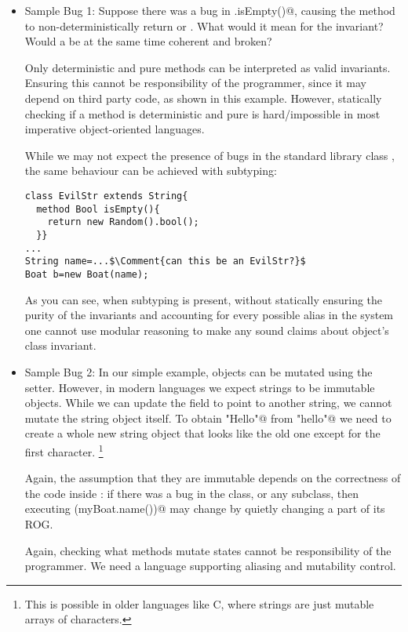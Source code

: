 \begin{itemize}
\item Sample Bug 1:
Suppose there was a bug in \Q@String.isEmpty()@, causing the method to non-deterministically return \Q@true@ or \Q@false@.
What would it mean for the \Q@Boat@ invariant?
Would a \Q@Boat@ be at the same time 
coherent and broken?

Only deterministic and pure methods can be interpreted as valid invariants.
Ensuring this cannot be responsibility of the \Q@Boat@ programmer, since it may depend on third party code, as shown in this example.
However, statically checking if a method is deterministic and pure is hard/impossible in most imperative object-oriented languages.

While we may not expect the presence of bugs in the standard library class \Q@String@, the same behaviour can be achieved with subtyping:
\saveSpace
\begin{lstlisting}
class EvilStr extends String{
  method Bool isEmpty(){
    return new Random().bool();
  }}
...
String name=...$\Comment{can this be an EvilStr?}$
Boat b=new Boat(name);
\end{lstlisting}
\saveSpace
As you can see, when subtyping is present,
without statically ensuring the purity of the invariants and accounting
for every possible alias in the system one cannot use modular 
reasoning to make any sound claims about object's class invariant.


\item Sample Bug 2:
In our simple example, \Q@Boat@ objects can be mutated using the setter.
However, in modern languages we expect strings to be immutable objects. While we can update the field \Q@name@ to point to another string, we cannot mutate the string object itself.
To obtain  \Q@"Hello"@ from \Q@"hello"@ we need to create a whole new string object that looks like the old one except for the first character.%
\footnote{This is possible in older languages like C, where strings are just mutable arrays of characters.}

Again, the assumption that they are immutable depends on the correctness of the code inside \Q@String@: if there was a bug in the \Q@String@ class, or any \Q@String@ subclass, then executing 
\Q@println(myBoat.name())@ may change \Q@myBoat@ by quietly changing a part of its ROG.

Again, checking
what methods mutate states cannot be responsibility of the \Q@Boat@ programmer.
We need a language supporting aliasing and mutability control.



\end{itemize}
